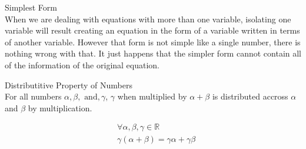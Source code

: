 \documentclass{book}
\begin{document}
  {\remark Simplest Form \\
    When we are dealing with equations with more than one variable, isolating one variable will result creating an equation in the form of a variable written in terms of another variable. However that form is not simple like a single number, there is nothing wrong with that. It just happens that the simpler form cannot contain all of the information of the original equation.\\
  }

  {\axiom Distributitive Property of Numbers \\
    For all numbers $\alpha, \beta, \text{ and}, \gamma$, $\gamma$ when multiplied by $\alpha + \beta$ is distributed accross $\alpha$ and $\beta$ by multiplication.

    \begin{align*}
      & \forall \alpha, \beta, \gamma \in \mathbb{R}\\
      & \gamma(\alpha + \beta) = \gamma \alpha + \gamma \beta
    \end{align*}
  }

  {\remark}
\end{document}
